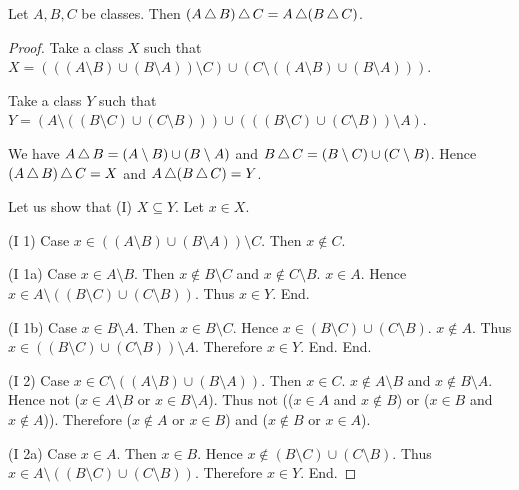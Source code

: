 \documentclass[10pt]{article}
\begin{document}
  \begin{forthel}
    \begin{proposition}
      Let $A, B, C$ be classes.
      Then $(A \mathop{\triangle} B) \mathop{\triangle} C = A \mathop{\triangle} (B \mathop{\triangle} C)$.
    \end{proposition}
    \begin{proof}
      Take a class $X$ such that $X = (((A \setminus B) \cup (B \setminus A)) \setminus C) \cup (C \setminus ((A \setminus B) \cup (B \setminus A)))$.

      Take a class $Y$ such that $Y = (A \setminus ((B \setminus C) \cup (C \setminus B))) \cup (((B \setminus C) \cup (C \setminus B)) \setminus A)$.

      We have $A \mathop{\triangle} B = (A \setminus B) \cup (B \setminus A)$ and $B \mathop{\triangle} C = (B \setminus C) \cup (C \setminus B)$.
      Hence $(A \mathop{\triangle} B) \mathop{\triangle} C = X$ and $A \mathop{\triangle} (B \mathop{\triangle} C) = Y$.

      Let us show that (I) $X \subseteq Y$.
        Let $x \in X$.

        (I 1) Case $x \in ((A \setminus B) \cup (B \setminus A)) \setminus C$.
          Then $x \notin C$.

          (I 1a) Case $x \in A \setminus B$.
            Then $x \notin B \setminus C$ and $x \notin C \setminus B$. $x \in A$.
            Hence $x \in A \setminus ((B \setminus C) \cup (C \setminus B))$.
            Thus $x \in Y$.
          End.

          (I 1b) Case $x \in B \setminus A$.
            Then $x \in B \setminus C$.
            Hence $x \in (B \setminus C) \cup (C \setminus B)$. $x \notin A$.
            Thus $x \in ((B \setminus C) \cup (C \setminus B)) \setminus A$.
            Therefore $x \in Y$.
          End.
        End.

        (I 2) Case $x \in C \setminus ((A \setminus B) \cup (B \setminus A))$.
          Then $x \in C$.
          $x \notin A \setminus B$ and $x \notin B \setminus A$.
          Hence not ($x \in A \setminus B$ or $x \in B \setminus A$).
          Thus not (($x \in A$ and $x \notin B$) or ($x \in B$ and $x \notin A$)).
          Therefore ($x \notin A$ or $x \in B$) and ($x \notin B$ or $x \in A$).

          (I 2a) Case $x \in A$.
            Then $x \in B$.
            Hence $x \notin (B \setminus C) \cup (C \setminus B)$.
            Thus $x \in A \setminus ((B \setminus C) \cup (C \setminus B))$.
            Therefore $x \in Y$.
          End.


\end{proof}
\end{forthel}
\end{document}
